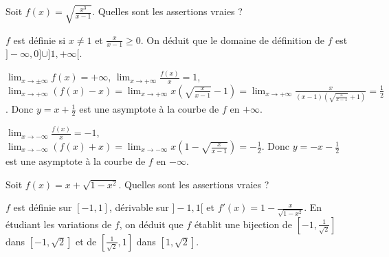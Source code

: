 \begin{question} 
Soit $f(x)=\sqrt{\frac{x^3}{x-1}}$.  Quelles sont les assertions vraies ?

\begin{answers}
    \good{Le domaine de définition de $f$ est $]-\infty, 0]\cup ]1,+\infty[$.}
         



  
\end{answers}
\begin{explanations}
$f$ est définie si $x\neq 1$ et $\frac{x}{x-1}\ge 0$. On déduit que le domaine de définition de $f$ est $]-\infty, 0]\cup ]1,+\infty[$.

$\lim_{x \to \pm \infty}f(x) = + \infty$,  $\lim_{x \to + \infty}\frac{f(x)}{x} = 1$, $\lim_{x \to + \infty}(f(x)-x) = \lim_{x \to + \infty}x(\sqrt{\frac{x}{x-1}}-1)= \lim_{x \to + \infty} \frac{x}{(x-1)(\sqrt{\frac{x}{x-1}}+1)}= \frac{1}{2}$. Donc $y=x+\frac{1}{2}$ est une asymptote à la courbe de $f$ en $+\infty$.

$\lim_{x \to - \infty}\frac{f(x)}{x} = -1$,  $\lim_{x \to - \infty}(f(x)+x) = \lim_{x \to - \infty}x(1-\sqrt{\frac{x}{x-1}})= -\frac{1}{2}$. Donc $y=-x-  \frac{1}{2}$ est une asymptote à la courbe de $f$ en $-\infty$.
\end{explanations}


\end{question}




\begin{question} 
Soit $f(x)=x+ \sqrt{ 1-x^2}$.  Quelles sont les assertions vraies ?

\begin{answers}



\end{answers}
\begin{explanations}
$f$ est définie sur $[-1,1]$, dérivable sur $]-1,1[$ et $f'(x)= 1-\frac{x}{\sqrt{1-x^2}}$. En étudiant les variations de $f$, on déduit que $f$ établit une bijection de $[-1,\frac{1}{\sqrt 2}]$ dans $[-1,\sqrt 2]$ et de $[\frac{1}{\sqrt 2}, 1]$  dans $[1,\sqrt 2]$.
\end{explanations}


\end{question}




